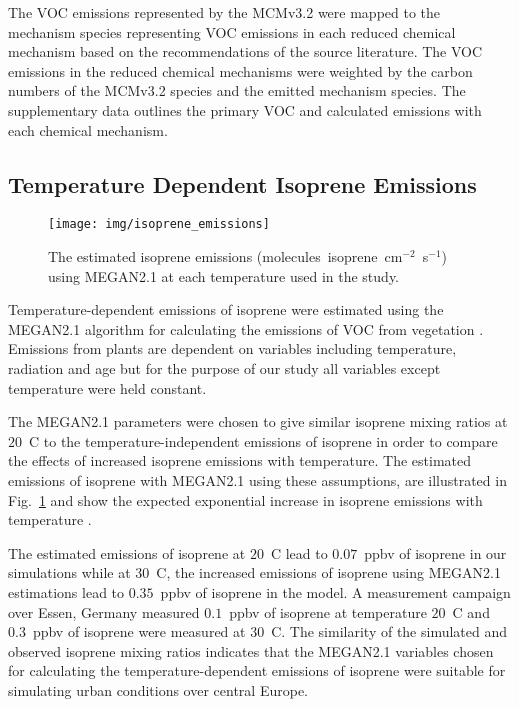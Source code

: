 The VOC emissions represented by the MCMv3.2 were mapped to the mechanism species representing VOC emissions in each reduced chemical mechanism based on the recommendations of the source literature.
The VOC emissions in the reduced chemical mechanisms were weighted by the carbon numbers of the MCMv3.2 species and the emitted mechanism species. 
The supplementary data outlines the primary VOC and calculated emissions with each chemical mechanism.

\subsection{Temperature Dependent Isoprene Emissions} \label{ss:megan}
\begin{figure}[t]%
    \centering%
    \caption{The estimated isoprene emissions (molecules~isoprene~cm$^{-2}$~s$^{-1}$) using MEGAN2.1 at each temperature used in the study.}
    \label{f:isoprene_emissions}%
    \texttt{[image: img/isoprene\_emissions]}
\end{figure}
Temperature-dependent emissions of isoprene were estimated using the MEGAN2.1 algorithm for calculating the emissions of VOC from vegetation \citep{Guenther:2012}.
Emissions from plants are dependent on variables including temperature, radiation and age but for the purpose of our study all variables except temperature were held constant.

The MEGAN2.1 parameters were chosen to give similar isoprene mixing ratios at $20$~\degree C to the temperature-independent emissions of isoprene in order to compare the effects of increased isoprene emissions with temperature.
The estimated emissions of isoprene with MEGAN2.1 using these assumptions, are illustrated in Fig.~\ref{f:isoprene_emissions} and show the expected exponential increase in isoprene emissions with temperature \citep{Guenther:2006}.

The estimated emissions of isoprene at $20$~\degree C lead to $0.07$~ppbv of isoprene in our simulations while at $30$~\degree C, the increased emissions of isoprene using MEGAN2.1 estimations lead to $0.35$~ppbv of isoprene in the model.
A measurement campaign over Essen, Germany \citep{Wagner:2014} measured $0.1$~ppbv of isoprene at temperature $20$~\degree C and $0.3$~ppbv of isoprene were measured at $30$~\degree C.
The similarity of the simulated and observed isoprene mixing ratios indicates that the MEGAN2.1 variables chosen for calculating the temperature-dependent emissions of isoprene were suitable for simulating urban conditions over central Europe.
